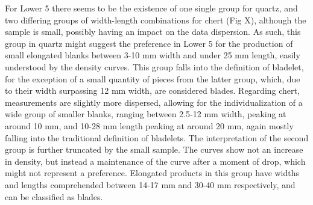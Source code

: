 \documentclass[12pt,twoside]{reedthesis}
\begin{document}
For Lower 5 there seems to be the existence of one single group for quartz, and two differing groups of width-length combinations for chert (Fig X), although the sample is small, possibly having an impact on the data dispersion. As such, this group in quartz might suggest the preference in Lower 5 for the production of small elongated blanks between 3-10 mm width and under 25 mm length, easily understood by the density curves. This group falls into the definition of bladelet, for the exception of a small quantity of pieces from the latter group, which, due to their width surpassing 12 mm width, are considered blades. Regarding chert, measurements are slightly more dispersed, allowing for the individualization of a wide group of smaller blanks, ranging between 2.5-12 mm width, peaking at around 10 mm, and 10-28 mm length peaking at around 20 mm, again mostly falling into the traditional definition of bladelets. The interpretation of the second group is further truncated by the small sample. The curves show not an increase in density, but instead a maintenance of the curve after a moment of drop, which might not represent a preference. Elongated products in this group have widths and lengths comprehended between 14-17 mm and 30-40 mm respectively, and can be classified as blades.
\end{document}
